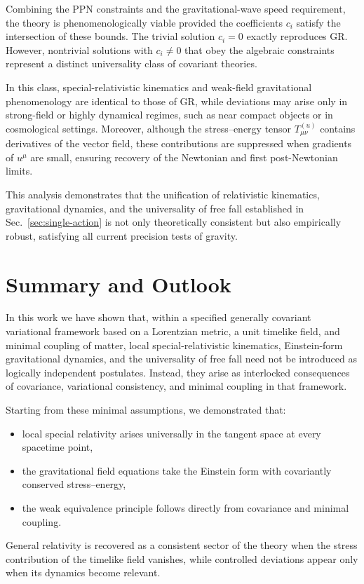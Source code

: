 \documentclass[11pt]{article}
\begin{document}
        Combining the PPN constraints and the gravitational-wave speed requirement, the
        theory is phenomenologically viable provided the coefficients $c_i$ satisfy the
        intersection of these bounds.
        The trivial solution $c_i = 0$ exactly reproduces GR.
        However, nontrivial solutions with $c_i \neq 0$ that obey the algebraic
        constraints represent a distinct universality class of covariant theories.

        In this class, special-relativistic kinematics and weak-field gravitational
        phenomenology are identical to those of GR, while deviations may arise only in
        strong-field or highly dynamical regimes, such as near compact objects or in
        cosmological settings.
        Moreover, although the stress--energy tensor $T^{(u)}_{\mu\nu}$ contains
        derivatives of the vector field, these contributions are suppressed when
        gradients of $u^\mu$ are small, ensuring recovery of the Newtonian and
        first post-Newtonian limits.

        This analysis demonstrates that the unification of relativistic kinematics,
        gravitational dynamics, and the universality of free fall established in
        Sec.~\ref{sec:single-action} is not only theoretically consistent but also
        empirically robust, satisfying all current precision tests of gravity.


    \section{Summary and Outlook}
    \label{sec:summary}

    In this work we have shown that, within a specified generally covariant
    variational framework based on a Lorentzian metric, a unit timelike field, and
    minimal coupling of matter, local special-relativistic kinematics, Einstein-form
    gravitational dynamics, and the universality of free fall need not be introduced
    as logically independent postulates.
    Instead, they arise as interlocked consequences of covariance, variational
    consistency, and minimal coupling in that framework.

    Starting from these minimal assumptions, we demonstrated that:
    \begin{itemize}
        \item local special relativity arises universally in the tangent space at
        every spacetime point,
        \item the gravitational field equations take the Einstein form with
        covariantly conserved stress--energy,
        \item the weak equivalence principle follows directly from covariance and
        minimal coupling.
    \end{itemize}
    General relativity is recovered as a consistent sector of the theory when the
    stress contribution of the timelike field vanishes, while controlled deviations
    appear only when its dynamics become relevant.
\end{document}
